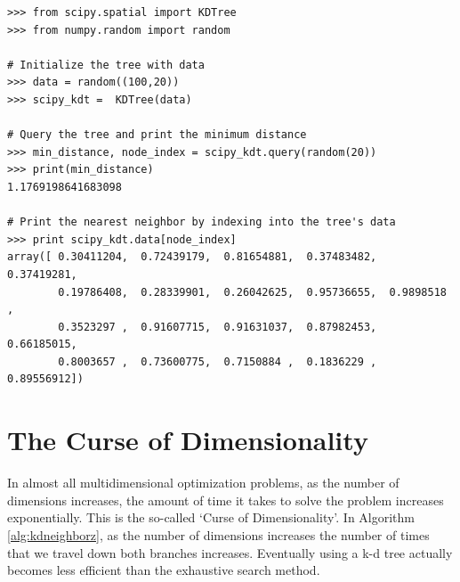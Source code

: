 \begin{lstlisting}
>>> from scipy.spatial import KDTree
>>> from numpy.random import random

# Initialize the tree with data
>>> data = random((100,20))
>>> scipy_kdt =  KDTree(data)

# Query the tree and print the minimum distance
>>> min_distance, node_index = scipy_kdt.query(random(20))
>>> print(min_distance)
1.1769198641683098

# Print the nearest neighbor by indexing into the tree's data
>>> print scipy_kdt.data[node_index]
array([ 0.30411204,  0.72439179,  0.81654881,  0.37483482,  0.37419281,
        0.19786408,  0.28339901,  0.26042625,  0.95736655,  0.9898518 ,
        0.3523297 ,  0.91607715,  0.91631037,  0.87982453,  0.66185015,
        0.8003657 ,  0.73600775,  0.7150884 ,  0.1836229 ,  0.89556912])
\end{lstlisting}

\section*{The Curse of Dimensionality}

In almost all multidimensional optimization problems, as the number of dimensions increases, the amount of time it takes to solve the problem increases exponentially.
This is the so-called `Curse of Dimensionality'.
In Algorithm \ref{alg:kdneighborz}, as the number of dimensions increases the number of times that we travel down both branches increases. Eventually using a k-d tree actually becomes less efficient than the exhaustive search method.

